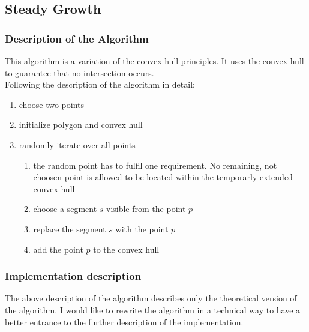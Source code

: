 \subsection{Steady Growth}
\subsubsection{Description of the Algorithm}
This algorithm is a variation of the convex hull principles. It uses
the convex hull to guarantee that no intersection occurs.
\\[12pt]
Following the description of the algorithm in detail:

\begin{enumerate}
  \item choose two points
  \item initialize polygon and convex hull
  \item randomly iterate over all points
  \begin{enumerate}
    \item the random point has to fulfil one requirement. No remaining, not
      choosen point is allowed to be located within the temporarly extended
      convex hull 
    \item choose a segment $s$ visible from the point $p$
    \item replace the segment $s$ with the point $p$
    \item add the point $p$ to the convex hull
  \end{enumerate}
\end{enumerate}

\subsubsection{Implementation description}
The above description of the algorithm describes only the theoretical
version of the algorithm. I would like to rewrite the algorithm in a
technical way to have a better entrance to the further description of
the implementation.

